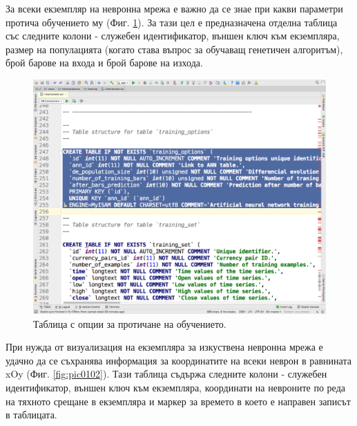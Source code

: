 \documentclass[book,14pt,oneside,openany]{memoir}
\begin{document}
За всеки екземпляр на невронна мрежа е важно да се знае при какви параметри протича обучението му (Фиг. \ref{fig:pic0101}). За тази цел е предназначена отделна таблица със следните колони - служебен идентификатор, външен ключ към екземпляра, размер на популацията (когато става въпрос за обучаващ генетичен алгоритъм), брой барове на входа и брой барове на изхода.

\begin{figure}[h]
  \centering
  \includegraphics[height=0.45\pdfpageheight]{pic0101}
  \caption{Таблица с опции за протичане на обучението.}
\label{fig:pic0101}
\end{figure}
\FloatBarrier

При нужда от визуализация на екземпляра за изкуствена невронна мрежа е удачно да се съхранява информация за координатите на всеки неврон в равнината xOy (Фиг. \ref{fig:pic0102}). Тази таблица съдържа следните колони - служебен идентификатор, външен ключ към екземпляра, координати на невроните по реда на тяхното срещане в екземпляра и маркер за времето в което е направен записът в таблицата. 
\end{document}
